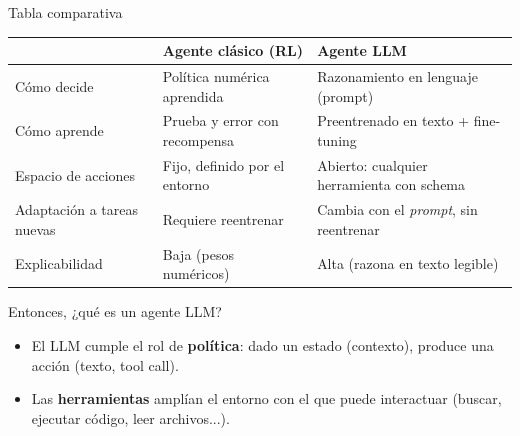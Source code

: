 \begin{frame}{Tabla comparativa}
  \small
  \begin{center}
  \begin{tabular}{@{}p{3.1cm}p{4.1cm}p{4.1cm}@{}}
    \toprule
    & \textbf{Agente clásico (RL)} & \textbf{Agente LLM} \\
    \midrule
    Cómo decide & Política numérica aprendida & Razonamiento en lenguaje (prompt) \\
    Cómo aprende & Prueba y error con recompensa & Preentrenado en texto + fine-tuning \\
    Espacio de acciones & Fijo, definido por el entorno & Abierto: cualquier herramienta con schema \\
    Adaptación a tareas nuevas & Requiere reentrenar & Cambia con el \emph{prompt}, sin reentrenar \\
    Explicabilidad & Baja (pesos numéricos) & Alta (razona en texto legible) \\
    \bottomrule
  \end{tabular}
  \end{center}
\end{frame}

\begin{frame}{Entonces, ¿qué es un agente LLM?}
  \vfill
  \begin{itemize}
    \item El LLM cumple el rol de \textbf{política}: dado un estado
      (contexto), produce una acción (texto, tool call).
    \item Las \textbf{herramientas} amplían el entorno con el que puede
      interactuar (buscar, ejecutar código, leer archivos...).
  \end{itemize}
\end{frame}

